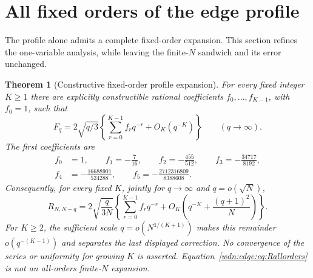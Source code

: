 \documentclass[11pt,letterpaper]{article}
\newtheorem{theorem}{Theorem}[section]
\theoremstyle{remark}\newtheorem{remark}[theorem]{Remark}
\begin{document}
\section{All fixed orders of the edge profile}\label{wdn:edge:sec:allorders}
The profile alone admits a complete fixed-order expansion. This section
refines the one-variable analysis, while leaving the finite-$N$ sandwich
and its error unchanged.

\begin{theorem}[Constructive fixed-order profile expansion]\label{wdn:edge:thm:allorders}
For every fixed integer $K\ge1$ there are explicitly constructible
rational coefficients $f_0,\ldots,f_{K-1}$, with $f_0=1$, such that
\begin{equation}\label{wdn:edge:eq:Fallorders}
 F_q=2\sqrt{q/3}\left\{\sum_{r=0}^{K-1}f_rq^{-r}+O_K(q^{-K})\right\}
 \qquad(q\to\infty).
\end{equation}
The first coefficients are
\begin{equation}\label{wdn:edge:eq:fvalues}
 \begin{split}
 f_0&=1,\qquad f_1=-\frac7{16},\qquad f_2=-\frac{455}{512},\qquad
 f_3=-\frac{34717}{8192},\\
 f_4&=-\frac{16688901}{524288},\qquad
 f_5=-\frac{2712316809}{8388608}.
 \end{split}
\end{equation}
Consequently, for every fixed $K$, jointly for $q\to\infty$ and
$q=o(\sqrt N)$,
\begin{equation}\label{wdn:edge:eq:Rallorders}
 R_{N,N-q}=2\sqrt{\frac q{3N}}
 \left\{\sum_{r=0}^{K-1}f_rq^{-r}
       +O_K\left(q^{-K}+\frac{(q+1)^2}{N}\right)\right\}.
\end{equation}
For $K\ge2$, the sufficient scale $q=o(N^{1/(K+1)})$ makes this
remainder $o(q^{-(K-1)})$ and separates the last displayed correction.
No convergence of the series or uniformity for growing $K$ is asserted.
Equation~\eqref{wdn:edge:eq:Rallorders} is not an all-orders finite-$N$ expansion.
\end{theorem}
\end{document}
